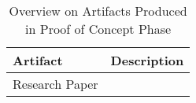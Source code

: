 
\begin{table}
  \label{tbl:phase-2-artifacts}
  \caption{Overview on Artifacts Produced in Proof of Concept Phase}

  \begin{tabular}{|l|l|}
    \hline
    \bf{Artifact}       & \bf{Description} \\ \hline
    Research Paper      &                  \\ \hline
  \end{tabular}

\end{table}
